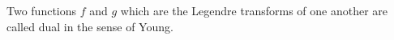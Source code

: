 Two functions $f$ and $g$ which are the Legendre transforms of one another are called dual in the sense of Young.

